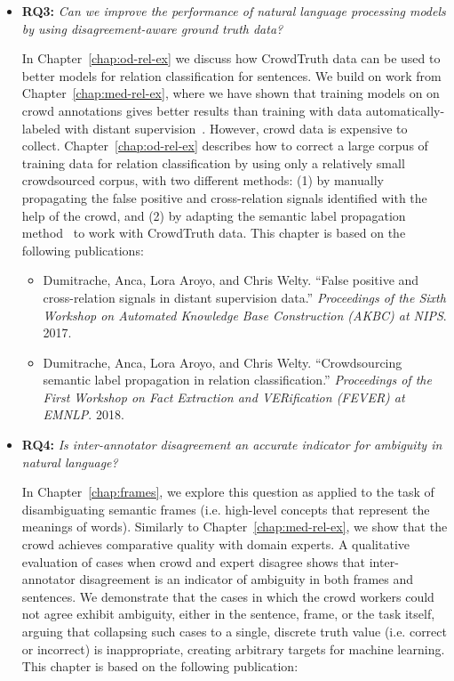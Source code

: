 \begin{itemize}
    \item \textbf{RQ3:} \textit{Can we improve the performance of natural language processing models by using disagreement-aware ground truth data?}
    
    In Chapter~\ref{chap:od-rel-ex} we discuss how CrowdTruth data can be used to better models for relation classification for sentences. We build on work from Chapter~\ref{chap:med-rel-ex}, where we have shown that training models on on crowd annotations gives better results than training with data automatically-labeled with distant supervision~\cite{mintz2009distant}. However, crowd data is expensive to collect. Chapter~\ref{chap:od-rel-ex} describes how to correct a large corpus of training data for relation classification by using only a relatively small crowdsourced corpus, with two different methods: (1) by manually propagating the false positive and cross-relation signals identified with the help of the crowd, and (2) by adapting the semantic label propagation method~\cite{sterckx2016knowledge} to work with CrowdTruth data. This chapter is based on the following publications:
    
    \begin{itemize}
        \item Dumitrache, Anca, Lora Aroyo, and Chris Welty. ``False positive and cross-relation signals in distant supervision data.'' \textit{Proceedings of the Sixth Workshop on Automated Knowledge Base Construction (AKBC) at NIPS}. 2017.~\cite{dumitrache2017false}
        
        \item Dumitrache, Anca, Lora Aroyo, and Chris Welty. ``Crowdsourcing semantic label propagation in relation classification.'' \textit{Proceedings of the First Workshop on Fact Extraction and VERification (FEVER) at EMNLP}. 2018.~\cite{dumitrache2018crowdsourcing}
    \end{itemize}

    \item \textbf{RQ4:} \textit{Is inter-annotator disagreement an accurate indicator for ambiguity in natural language?}
    
    In Chapter~\ref{chap:frames}, we explore this question as applied to the task of disambiguating semantic frames (i.e. high-level concepts that represent the meanings of words). Similarly to Chapter~\ref{chap:med-rel-ex}, we show that the crowd achieves comparative quality with domain experts. A qualitative evaluation of cases when crowd and expert disagree shows that inter-annotator disagreement is an indicator of ambiguity in both frames and sentences. We demonstrate that the cases in which the crowd workers could not agree exhibit ambiguity, either in the sentence, frame, or the task itself, arguing that collapsing such cases to a single, discrete truth value (i.e. correct or incorrect) is inappropriate, creating arbitrary targets for machine learning. This chapter is based on the following publication:
    

\end{itemize}
